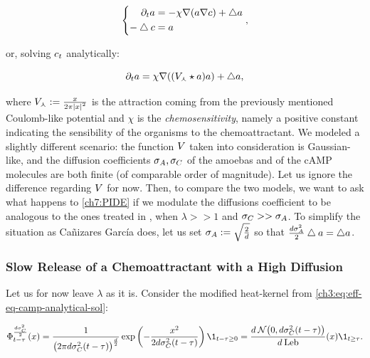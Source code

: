 \begin{equation}\label{conc:ANA-macro-amoebas}
	\left\{
	\begin{aligned}
		\partial_t a &= - \chi \nabla (a \nabla c) + \bigtriangleup a
		\\
		-\bigtriangleup c &= a
	\end{aligned}
	\right.,
\end{equation}

or, solving $c_t$ analytically:

\begin{equation}\label{conc:ANA-macro-amoebas-in-1-equation}
		\partial_t a =  \chi \nabla ( (V_\curlywedge \star a) a) + \bigtriangleup a,
\end{equation}

where $V_\curlywedge:= \frac{x}{2\pi \left| x \right|^2}$ is the attraction coming from the previously mentioned Coulomb-like potential and $\chi$ is the \emph{chemosensitivity}, namely a positive constant indicating the sensibility of the organisms to the chemoattractant.
We modeled a slightly different scenario: the function $V$ taken into consideration is Gaussian-like, and the diffusion coefficients $\sigma_A, \sigma_C$ of the amoebas and of the cAMP molecules are both finite (\ie of comparable order of magnitude).
Let us ignore the difference regarding $V$ for now.
Then, to compare the two models, we want to ask what happens to \ref{ch7:PIDE} if we modulate the diffusions coefficient to be analogous to the ones treated in \cite{ana}, \ie when $\lambda >> 1$ and $\sigma_C >> \sigma_A$.
To simplify the situation as Cañizares García does, let us set $\sigma_A := \sqrt{\frac{2}{d}}$ so that $\frac{d\sigma_A^2}{2} \bigtriangleup a = \bigtriangleup a$.

\subsubsection{Slow Release of a Chemoattractant with a High Diffusion}

Let us for now leave $\lambda$ as it is.
Consider the modified heat-kernel from \ref{ch3:eq:eff-eq-camp-analytical-sol}:

\begin{equation*}
	\heatkernel_{t-\tau}^{\frac{d\sigma_\camp^2}{2}}(x) 
	= 
	\frac{1}{
		\big( 2\pi d\sigma_\camp^2 (t-\tau) \big)^{\frac{d}{2}}
	}
	\exp \left(
	-\frac{x^2}{2 d\sigma_\camp^2 (t-\tau)}
	\right)
	\1_{t-\tau\geq 0} 
	= 
	\frac{d\: \Normal\big( 0, d\sigma_\camp^2 (t-\tau) \big)}{d\:\lebsge} (x)
	\1_{t\geq \tau}.
\end{equation*}

